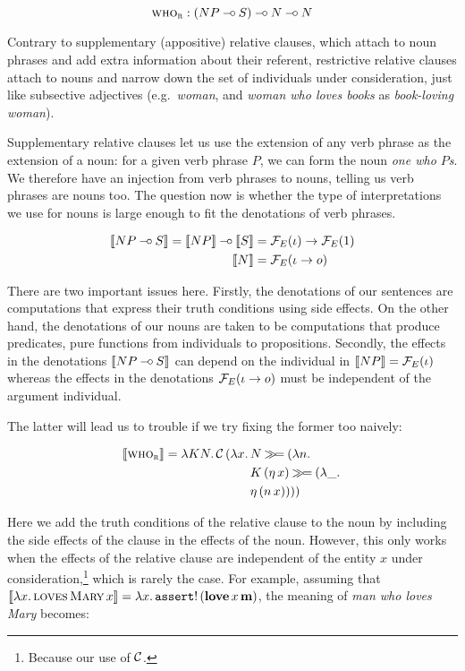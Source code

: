$$
\textsc{who}_{\textsc{r}} : (NP \mathbin{{-}\mkern-3.5mu{\circ}} S) \mathbin{{-}\mkern-3.5mu{\circ}} N \mathbin{{-}\mkern-3.5mu{\circ}} N
$$

Contrary to supplementary (appositive) relative clauses, which attach to
noun phrases and add extra information about their referent, restrictive
relative clauses attach to nouns and narrow down the set of individuals
under consideration, just like subsective adjectives (e.g.\ \emph{woman},
and \emph{woman who loves books} as \emph{book-loving woman}).

Supplementary relative clauses let us use the extension of any verb phrase
as the extension of a noun: for a given verb phrase $P$, we can form the
noun \emph{one who $P$s}. We therefore have an injection from verb phrases
to nouns, telling us verb phrases are nouns too. The question now is
whether the type of interpretations we use for nouns is large enough to fit
the denotations of verb phrases.

\begin{align*}
  \llbracket NP \mathbin{{-}\mkern-3.5mu{\circ}} S \rrbracket = \llbracket NP \rrbracket \mathbin{{-}\mkern-3.5mu{\circ}} \llbracket S \rrbracket &= \mathcal{F}_E(\iota) \to \mathcal{F}_E(1) \\
  \llbracket N \rrbracket &= \mathcal{F}_E(\iota \to o)
\end{align*}

There are two important issues here. Firstly, the denotations of our
sentences are computations that express their truth conditions using side
effects. On the other hand, the denotations of our nouns are taken to be
computations that produce predicates, pure functions from individuals to
propositions. Secondly, the effects in the denotations $\llbracket NP \mathbin{{-}\mkern-3.5mu{\circ}} S \rrbracket$
can depend on the individual in $\llbracket NP \rrbracket = \mathcal{F}_E(\iota)$ whereas the
effects in the denotations $\mathcal{F}_E(\iota \to o)$ must be independent of the
argument individual.

The latter will lead us to trouble if we try fixing the former too naively:

\begin{align*}
  \llbracket \textsc{who}_{\textsc{r}} \rrbracket = \lambda K N.\, \mathcal{C}\,(\lambda x.\, 
    &N \mathbin{\gg\!=} (\lambda n.\,  \\
    &K\,(\eta\,x) \mathbin{\gg\!=} (\lambda \_.\,  \\
    &\eta\,(n\,x))))
\end{align*}

Here we add the truth conditions of the relative clause to the noun by
including the side effects of the clause in the effects of the
noun. However, this only works when the effects of the relative clause are
independent of the entity $x$ under consideration,\footnote{Because our use
  of $\mathcal{C}$.} which is rarely the case. For example, assuming that
$\llbracket \lambda x.\, \textsc{loves}\,\textsc{Mary}\,x \rrbracket =
\lambda x.\, \mathtt{assert}!\,(\textbf{love}\,x\,\textbf{m})$, the meaning of
\emph{man who loves Mary} becomes:

